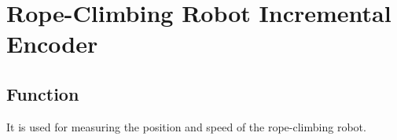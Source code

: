 \setchapterpreamble[u]{\margintoc}
\chapter{Rope-Climbing Robot Incremental Encoder}

\section{Function}
It is used for measuring the position and speed of the rope-climbing robot.